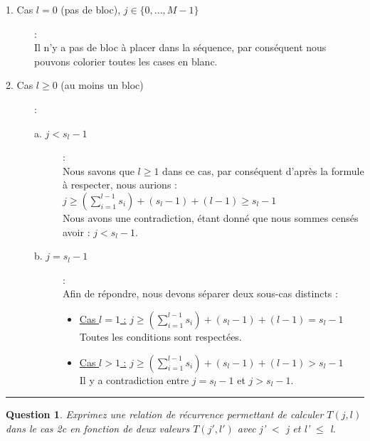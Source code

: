 \documentclass[a4paper,12pt]{article}
\newtheorem{exo}{Question}
\begin{document}
\begin{description}
	\item[1. Cas $l=0$ (pas de bloc), $j \in \{0,...,M-1\}$] :\\ 
	Il n'y a pas de bloc à placer dans la séquence, par conséquent nous pouvons colorier toutes les cases en blanc.\\

	\item[2. Cas $l \geq 0$ (au moins un bloc)] :
	\begin{description}
		\item[a. $j < s_l -1$] :\\
		Nous savons que $l \geq 1$ dans ce cas, par conséquent d'après la formule à respecter, nous aurions : $j \geq (\sum_{i=1}^{l-1} s_i) + (s_l - 1) + (l-1) \geq s_l - 1$\\
		Nous avons une contradiction, étant donné que nous sommes censés avoir : $j < s_l - 1$.\\

		\item[b. $j = s_l -1$] :\\ 
		Afin de répondre, nous devons séparer deux sous-cas distincts :
		\begin{itemize}
			\item \underline{Cas $l = 1$ :} $j \geq (\sum_{i=1}^{l-1} s_i) + (s_l - 1) + (l-1) = s_l - 1$\\
			Toutes les conditions sont respectées.\\

			\item \underline{Cas $l > 1$ :} $j \geq (\sum_{i=1}^{l-1} s_i) + (s_l - 1) + (l-1) > s_l - 1$\\
			Il y a contradiction entre $j = s_l - 1$ et $j > s_l - 1$.\\
		\end{itemize}
	\end{description}
\end{description}

\noindent\rule{\textwidth}{1pt}


\begin{exo}
	Exprimez une relation de récurrence permettant de calculer $T(j,l)$ dans le cas 2c en fonction de deux valeurs $T(j',l')$ avec j' $<$  j et l' $\leq$ l.
\end{exo}
\end{document}
